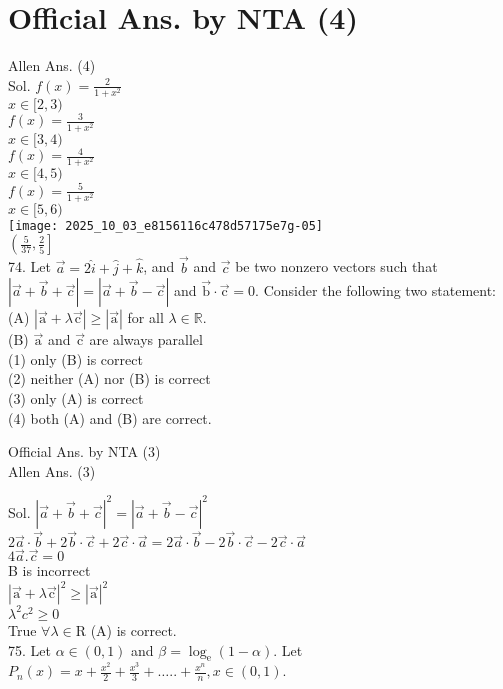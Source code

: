 \documentclass[10pt]{article}
\begin{document}
\section*{Official Ans. by NTA (4)}
Allen Ans. (4)\\
Sol. \(f(x)=\frac{2}{1+x^{2}}\)\\
\(x \in[2,3)\)\\
\(f(x)=\frac{3}{1+x^{2}}\)\\
\(x \in[3,4)\)\\
\(f(x)=\frac{4}{1+x^{2}}\)\\
\(x \in[4,5)\)\\
\(f(x)=\frac{5}{1+x^{2}}\)\\
\(x \in[5,6)\)\\
\texttt{[image: 2025\_10\_03\_e8156116c478d57175e7g-05]}\\
\(\left(\frac{5}{37}, \frac{2}{5}\right]\)\\
74. Let \(\vec{a}=2 \hat{i}+\hat{j}+\hat{k}\), and \(\vec{b}\) and \(\vec{c}\) be two nonzero vectors such that \(|\vec{a}+\vec{b}+\vec{c}|=|\vec{a}+\vec{b}-\vec{c}|\) and \(\overrightarrow{\mathrm{b}} \cdot \overrightarrow{\mathrm{c}}=0\). Consider the following two statement:\\
(A) \(|\overrightarrow{\mathrm{a}}+\lambda \overrightarrow{\mathrm{c}}| \geq|\overrightarrow{\mathrm{a}}|\) for all \(\lambda \in \mathbb{R}\).\\
(B) \(\overrightarrow{\mathrm{a}}\) and \(\overrightarrow{\mathrm{c}}\) are always parallel\\
(1) only (B) is correct\\
(2) neither (A) nor (B) is correct\\
(3) only (A) is correct\\
(4) both (A) and (B) are correct.

Official Ans. by NTA (3)\\
Allen Ans. (3)

Sol. \(|\vec{a}+\vec{b}+\vec{c}|^{2}=|\vec{a}+\vec{b}-\vec{c}|^{2}\)\\
\(2 \vec{a} \cdot \vec{b}+2 \vec{b} \cdot \vec{c}+2 \vec{c} \cdot \vec{a}=2 \vec{a} \cdot \vec{b}-2 \vec{b} \cdot \vec{c}-2 \vec{c} \cdot \vec{a}\)\\
\(4 \vec{a} . \vec{c}=0\)\\
B is incorrect\\
\(|\overrightarrow{\mathrm{a}}+\lambda \overrightarrow{\mathrm{c}}|^{2} \geq|\overrightarrow{\mathrm{a}}|^{2}\)\\
\(\lambda^{2} c^{2} \geq 0\)\\
True \(\forall \lambda \in \mathrm{R}\) (A) is correct.\\
75. Let \(\alpha \in(0,1)\) and \(\beta=\log _{\mathrm{e}}(1-\alpha)\). Let \(P_{n}(x)=x+\frac{x^{2}}{2}+\frac{x^{3}}{3}+\ldots . .+\frac{x^{n}}{n}, x \in(0,1)\).
\end{document}
